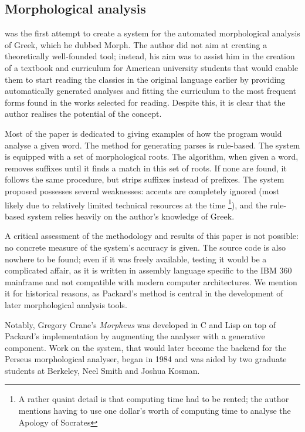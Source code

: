\subsection{Morphological analysis}

\cite{packard1973computer} was the first attempt to create a system
for the automated morphological analysis of Greek, which he dubbed
Morph. The author did not aim at creating a theoretically well-founded
tool; instead, his aim was to assist him in the creation of a textbook
and curriculum for American university students that would enable them
to start reading the classics in the original language earlier by
providing automatically generated analyses and fitting the curriculum
to the most frequent forms found in the works selected for
reading. Despite this, it is clear that the author realises the
potential of the concept.

Most of the paper is dedicated to giving examples of how the program
would analyse a given word. The method for generating parses is
rule-based. The system is equipped with a set of morphological roots.
The algorithm, when given a word, removes suffixes until it finds a
match in this set of roots. If none are found, it follows the same
procedure, but strips suffixes instead of prefixes. The system
proposed possesses several weaknesses: accents are completely ignored
(most likely due to relatively limited technical resources at the time
\footnote{A rather quaint detail is that computing time had to be
rented; the author mentions having to use one dollar's worth of
computing time to analyse the Apology of Socrates}), and the rule-based
system relies heavily on the author's knowledge of Greek.

A critical assessment of the methodology and results of this paper is
not possible: no concrete measure of the system's accuracy is
given. The source code is also nowhere to be found; even if it was
freely available, testing it would be a complicated affair, as it is
written in assembly language specific to the IBM 360 mainframe and not
compatible with modern computer architectures. We mention it for
historical reasons, as Packard's method is central in the development
of later morphological analysis tools. 

Notably, Gregory Crane's \textit{Morpheus} was developed in C and Lisp
on top of Packard's implementation by augmenting the analyser with a
generative component. Work on the system, that would later become the
backend for the Perseus morphological analyser, began in 1984 and was
aided by two graduate students at Berkeley, Neel Smith and Joshua
Kosman.

